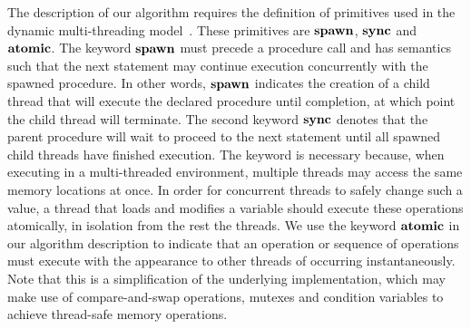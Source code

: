 The description of our algorithm requires the definition of primitives
used in the dynamic multi-threading model~\cite{cormen09:alg}. These
primitives are $\textbf{spawn}$, $\textbf{sync}$ and $\textbf{atomic}$. The keyword $\textbf{spawn}$
must precede a procedure call and has semantics such that the next
statement may continue execution concurrently with the spawned
procedure. In other words, $\textbf{spawn}$ indicates the creation of a child
thread that will execute the declared procedure until completion, at
which point the child thread will terminate. The second keyword
$\textbf{sync}$ denotes that the parent procedure will wait to proceed to the
next statement until all spawned child threads have finished
execution.  The keyword \Atomic is necessary because, when executing in a
multi-threaded environment, multiple threads may access the same
memory locations at once. In order for concurrent threads to safely
change such a value, a thread that loads and modifies a variable
should execute these operations atomically, in isolation from the rest
the threads. We use the keyword $\textbf{atomic}$ in our algorithm description
to indicate that an operation or sequence of operations must execute with
the appearance to other threads of occurring instantaneously. Note
that this is a simplification of the underlying implementation, which
may make use of compare-and-swap operations, mutexes and condition
variables to achieve thread-safe memory operations.


